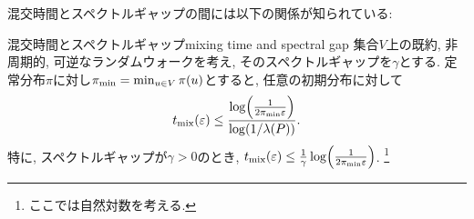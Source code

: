 \begin{comment}
\begin{proof}
    \cref{thm:eigendecomposition}で得られる空間$\pispace$の正規直交基底$x_1,\dots,x_n$を考え,
    関数$f$をそれらの線形結合
    \[ f = \sum_{i=1}^n f_i x_i\]
    で表す (ここで$f_i = \piprod{f,x_i}$).
    ここで, $x_1 = \allone$なので$f_1 = \E_\pi f$なので,
    両辺に左から$P$を掛けて移項すると
    \[
        Pf - \Epi[f] \allone  = \sum_{i=2}^n f_i P x_i = \sum_{i=2}^n \lambda_i f_i x_i
    \]
    を得る.
    両辺の$\pinorm{\cdot}$をとると, ピタゴラスの定理より
    \begin{align*}
        \pinorm{Pf - \Epi[f]\allone}^2 & = \sum_{i=2}^n f_i^2 \lambda_i^2                  \\
                                       & \le \lambda(P)^2\cdot \sum_{i=2}^n f_i^2          \\
                                       & = \lambda(P)^2\cdot \pinorm{f - \Epi[f]\allone}^2 \\
                                       & = \lambda(P)^2\cdot \Varpi f
    \end{align*}
    を得る.
\end{proof}
\end{comment}
混交時間とスペクトルギャップの間には以下の関係が知られている:
\begin{lemma}{混交時間とスペクトルギャップ}{mixing time and spectral gap}
    集合$V$上の既約, 非周期的, 可逆なランダムウォークを考え,
    そのスペクトルギャップを$\gamma$とする.
    定常分布$\pi$に対し$\pi_{\min} = \min_{u\in V} \pi(u)$とすると,
    任意の初期分布に対して
    \[ \tmix(\varepsilon) \le\frac{\log\rbra*{\frac{1}{2\pimin\varepsilon}}}{\log(1/\lambda(P))}. \]
    特に, スペクトルギャップが$\gamma>0$のとき,
    $\tmix(\varepsilon) \le \frac{1}{\gamma}\log\rbra*{\frac{1}{2\pimin\varepsilon}}$.
    \footnote{ここでは自然対数を考える.}
\end{lemma}
%
